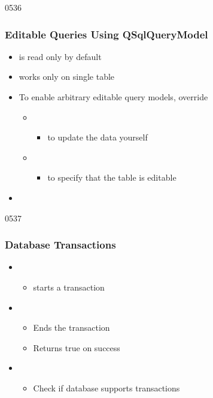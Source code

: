 \begin{slide}{0536}\frametitle{Editable Queries Using QSqlQueryModel}
\begin{itemize}
\item {} is read only by default
\item {} works only on single table
\medskip
\item To enable arbitrary editable query models, override
  \begin{itemize}
  \item {}
    \begin{itemize}
    \item to update the data yourself
    \end{itemize}
  \item {}
    \begin{itemize}
    \item to specify that the table is editable
    \end{itemize}  
  \end{itemize}

\item {}
\end{itemize}
\end{slide}

\begin{slide}{0537}\frametitle{Database Transactions}
\begin{itemize}
\item {}
  \begin{itemize}
  \item starts a transaction
  \end{itemize}
\item {} \\
  \begin{itemize}
  \item Ends the transaction
  \item Returns true on success
  \end{itemize}
\medskip
\item {}
  \begin{itemize}
  \item Check if database supports transactions
  \end{itemize} 
\end{itemize}
\end{slide}

